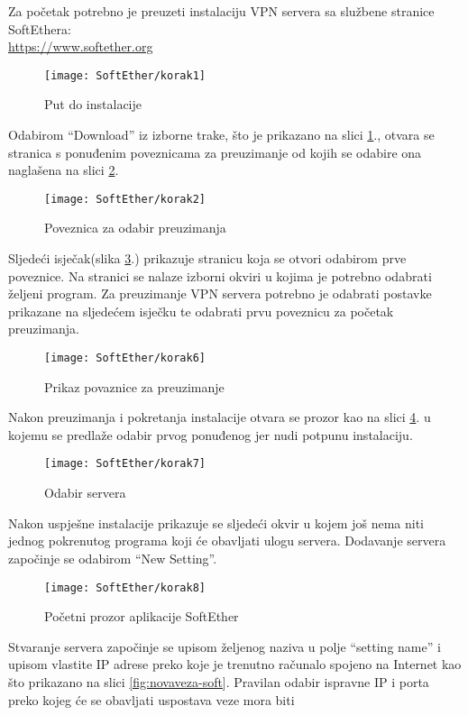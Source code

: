 \hfill \smallbreak
Za početak potrebno je preuzeti instalaciju VPN servera sa službene stranice SoftEthera:\\ \url{https://www.softether.org}
\begin{figure}[h!]
	\centering
     \texttt{[image: SoftEther/korak1]}
     \caption{Put do instalacije}
     \label{fig:link1-soft}
\end{figure}
\FloatBarrier
Odabirom ``Download'' iz izborne trake, što je prikazano na slici \ref{fig:link1-soft}., otvara se stranica s ponuđenim poveznicama za preuzimanje od kojih se odabire ona naglašena na slici \ref{fig:link2-soft}.
\begin{figure}[h!]
     \centering
     \texttt{[image: SoftEther/korak2]}
     \caption{Poveznica za odabir preuzimanja}
     \label{fig:link2-soft}
\end{figure}
\FloatBarrier
Sljedeći isječak(slika \ref{fig:link3-soft}.) prikazuje stranicu koja se otvori odabirom prve poveznice. Na stranici se nalaze izborni okviri u kojima je potrebno odabrati željeni program. Za preuzimanje VPN servera potrebno je odabrati postavke prikazane na sljedećem isječku te odabrati prvu poveznicu za početak preuzimanja.
\begin{figure}[h!]
     \centering
     \texttt{[image: SoftEther/korak6]}
     \caption{Prikaz povaznice za preuzimanje}
     \label{fig:link3-soft}
\end{figure}
\FloatBarrier
Nakon preuzimanja i pokretanja instalacije otvara se prozor kao na slici \ref{fig:odabir-soft}. u kojemu se predlaže odabir prvog ponuđenog jer nudi potpunu instalaciju.
\begin{figure}[h!]
     \centering
     \texttt{[image: SoftEther/korak7]}
     \caption{Odabir servera}
     \label{fig:odabir-soft}
\end{figure}
\FloatBarrier
Nakon uspješne instalacije prikazuje se sljedeći okvir u kojem još nema niti jednog pokrenutog programa koji će obavljati ulogu servera. Dodavanje servera započinje se odabirom ``New Setting''.
\begin{figure}[h!]
     \centering
     \texttt{[image: SoftEther/korak8]}
     \caption{Početni prozor aplikacije SoftEther}
\end{figure}
\FloatBarrier
Stvaranje servera započinje se upisom željenog naziva u polje ``setting name'' i upisom vlastite IP adrese preko koje je trenutno računalo spojeno na Internet kao što prikazano na slici \ref{fig:novaveza-soft}. Pravilan odabir ispravne IP i porta preko kojeg će se obavljati uspostava veze mora biti 
